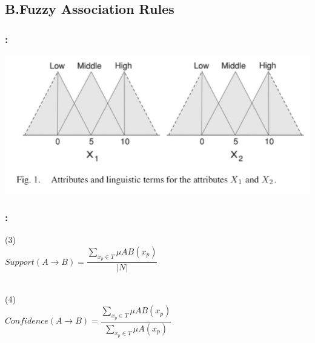 \documentclass{beamer}
\begin{document}
\begin{CJK*}{UTF8}{bsmi}
\begin{frame}
\end{frame}



\subsection{B.Fuzzy Association Rules}


\begin{frame}
	\frametitle{\insertsection : \insertsubsection}
\begin{center}
\includegraphics[width=1\linewidth]{./1.png}
\end{center}
\end{frame}


\begin{frame}
	\frametitle{\insertsection : \insertsubsection}
	
	\begin{block}{ (3)}
		~\\
		\centering\textbf{$Support(A\longrightarrow B)=\dfrac{\sum_{x_{p}\in T}^{ }{\mu {AB}(x_{p})}}{|N|}$}\\
		~\\
	\end{block}
	\begin{block}{ (4)}
		~\\
		\centering\textbf{$Confidence(A\longrightarrow B)=\dfrac{\sum_{x_{p}\in T}^{ }{\mu {AB}(x_{p})}}{\sum_{x_{p}\in T}^{ }{\mu {A}(x_{p})}}$}\\
		~\\

		~\\
	\end{block}
	

\end{frame}
\end{CJK*}
\end{document}
